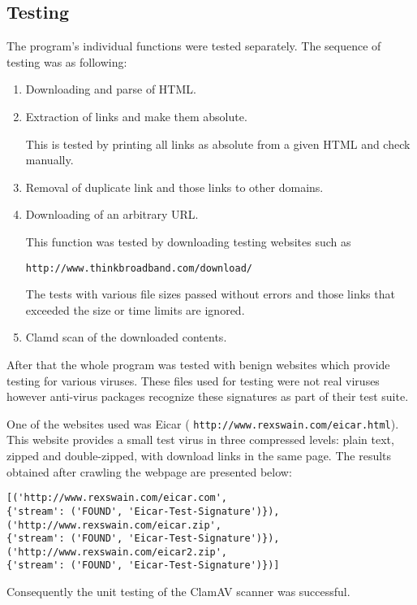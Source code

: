 \subsection{Testing}
The program's individual functions were tested separately. The sequence of 
testing was as following:
\begin{enumerate}
\item Downloading and parse of HTML.

\item Extraction of links and make them absolute.

This is tested by printing all links as absolute from a given HTML and check 
manually.

\item Removal of duplicate link and those links to other domains.

\item Downloading of an arbitrary URL.

This function was tested by downloading testing websites such as

\verb`http://www.thinkbroadband.com/download/`

The tests with various file 
sizes passed without errors and those links that exceeded the size or time limits are 
ignored. 

\item Clamd scan of the downloaded contents. 
\end{enumerate}
After that the whole program was tested with benign websites which provide 
testing for various viruses. These files used for testing were not real viruses however anti-virus packages recognize these signatures 
as part of their test suite. 

One of the websites used was Eicar (
\verb`http://www.rexswain.com/eicar.html`). This website provides a small test 
virus in three compressed levels: plain text, zipped and double-zipped, with 
download links in the same page. The results obtained after 
crawling the webpage are presented below:
\begin{verbatim}
[('http://www.rexswain.com/eicar.com', 
{'stream': ('FOUND', 'Eicar-Test-Signature')}), 
('http://www.rexswain.com/eicar.zip', 
{'stream': ('FOUND', 'Eicar-Test-Signature')}), 
('http://www.rexswain.com/eicar2.zip', 
{'stream': ('FOUND', 'Eicar-Test-Signature')})]
\end{verbatim}
Consequently the unit testing of the ClamAV scanner was successful. 
